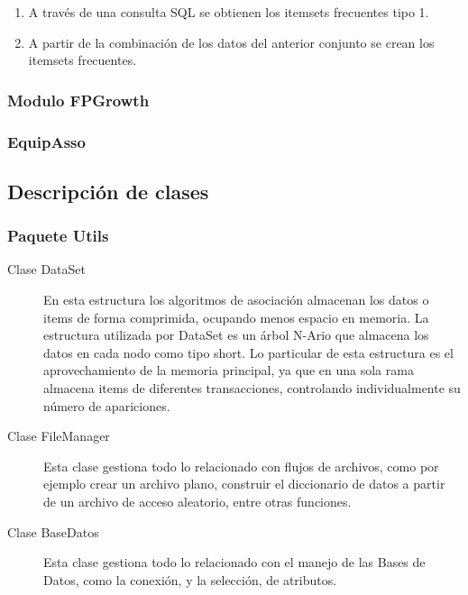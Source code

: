 \begin{enumerate}
\item A trav\'es de una consulta SQL se obtienen los itemsets frecuentes tipo 1.
\item A partir de la combinaci\'on de los datos del anterior conjunto se crean los itemsets frecuentes.
\end{enumerate}

\subsubsection{Modulo FPGrowth}

\subsubsection{EquipAsso}


\subsection{Descripci\'on de clases}

\subsubsection{Paquete Utils}
\begin{description}
\item [Clase DataSet] En esta estructura los algoritmos de asociaci\'on almacenan los datos o items de 
forma comprimida, ocupando menos espacio en memoria. La estructura utilizada por DataSet es un \'arbol
N-Ario que almacena los datos en cada nodo como tipo short. Lo particular de esta estructura es el 
aprovechamiento de la memoria principal, ya que en una sola rama almacena items de diferentes 
transacciones, controlando individualmente su n\'umero de apariciones.
\item [Clase FileManager] Esta clase gestiona todo lo relacionado con flujos de archivos, como por 
ejemplo crear un archivo plano, construir el diccionario de datos a partir de un archivo de acceso
aleatorio, entre otras funciones.
\item [Clase BaseDatos] Esta clase gestiona todo lo relacionado con el manejo de las Bases de Datos, 
como la conexi\'on, y la selecci\'on, de atributos.
\end{description}


